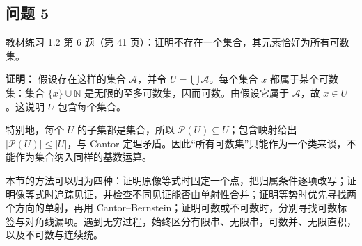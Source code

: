 \documentclass[11pt,a4paper]{article}
\begin{document}
\subsection{问题 5}\label{ux95eeux9898-5}

教材练习 1.2 第 6 题（第 41
页）：证明不存在一个集合，其元素恰好为所有可数集。

\textbf{证明：} 假设存在这样的集合 \(\mathcal A\)，并令
\(U=\bigcup\mathcal A\)。每个集合 \(x\) 都属于某个可数集：集合
\(\{x\}\cup\mathbb N\) 是无限的至多可数集，因而可数。由假设它属于
\(\mathcal A\)，故 \(x\in U\)。这说明 \(U\) 包含每个集合。

特别地，每个 \(U\) 的子集都是集合，所以
\(\mathcal P(U)\subseteq U\)；包含映射给出 \(|\mathcal P(U)|\le|U|\)，与
Cantor
定理矛盾。因此``所有可数集''只能作为一个类来谈，不能作为集合纳入同样的基数运算。

本节的方法可以归为四种：证明原像等式时固定一个点，把归属条件逐项改写；证明像等式时追踪见证，并检查不同见证能否由单射性合并；证明等势时优先寻找两个方向的单射，再用
Cantor--Bernstein；证明可数或不可数时，分别寻找可数标签与对角线漏项。遇到无穷过程，始终区分有限串、无限串，可数并、无限直积，以及不可数与连续统。
\end{document}

